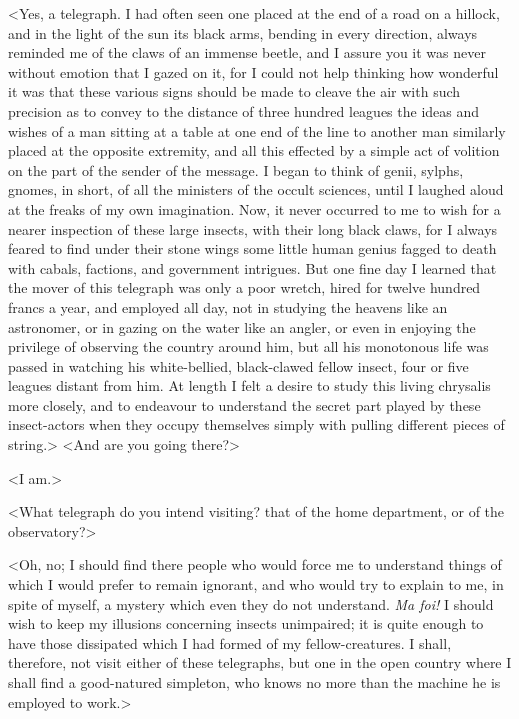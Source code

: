  <Yes, a telegraph. I had often seen one placed at the end of a road on a hillock, and in the light of the sun its black arms, bending in every direction, always reminded me of the claws of an immense beetle, and I assure you it was never without emotion that I gazed on it, for I could not help thinking how wonderful it was that these various signs should be made to cleave the air with such precision as to convey to the distance of three hundred leagues the ideas and wishes of a man sitting at a table at one end of the line to another man similarly placed at the opposite extremity, and all this effected by a simple act of volition on the part of the sender of the message. I began to think of genii, sylphs, gnomes, in short, of all the ministers of the occult sciences, until I laughed aloud at the freaks of my own imagination. Now, it never occurred to me to wish for a nearer inspection of these large insects, with their long black claws, for I always feared to find under their stone wings some little human genius fagged to death with cabals, factions, and government intrigues. But one fine day I learned that the mover of this telegraph was only a poor wretch, hired for twelve hundred francs a year, and employed all day, not in studying the heavens like an astronomer, or in gazing on the water like an angler, or even in enjoying the privilege of observing the country around him, but all his monotonous life was passed in watching his white-bellied, black-clawed fellow insect, four or five leagues distant from him. At length I felt a desire to study this living chrysalis more closely, and to endeavour to understand the secret part played by these insect-actors when they occupy themselves simply with pulling different pieces of string.>  <And are you going there?> 

 <I am.> 

 <What telegraph do you intend visiting? that of the home department, or of the observatory?> 

 <Oh, no; I should find there people who would force me to understand things of which I would prefer to remain ignorant, and who would try to explain to me, in spite of myself, a mystery which even they do not understand. \textit{Ma foi!} I should wish to keep my illusions concerning insects unimpaired; it is quite enough to have those dissipated which I had formed of my fellow-creatures. I shall, therefore, not visit either of these telegraphs, but one in the open country where I shall find a good-natured simpleton, who knows no more than the machine he is employed to work.> 

